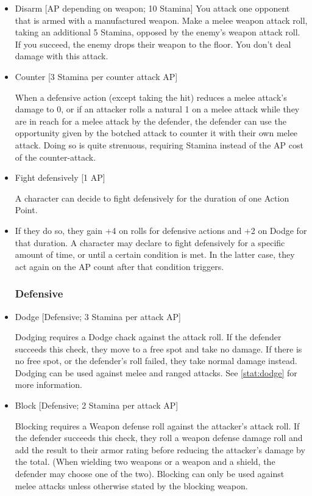 \begin{itemize}
\item Disarm [AP depending on weapon; 10 Stamina]
You attack one opponent that is armed with a manufactured weapon.
Make a melee weapon attack roll, taking an additional 5 Stamina, opposed by the enemy's weapon attack roll.
If you succeed, the enemy drops their weapon to the floor.
You don't deal damage with this attack.\\


\item Counter [3 Stamina per counter attack AP]

When a defensive action (except taking the hit) reduces a melee attack's damage to 0, or if an attacker rolls a natural 1 on a melee attack while they are in reach for a melee attack by the defender, the defender can use the opportunity given by the botched attack to counter it with their own melee attack.
Doing so is quite strenuous, requiring Stamina instead of the AP cost of the counter-attack.


\item Fight defensively [1 AP]

A character can decide to fight defensively for the duration of one Action Point.

\item If they do so, they gain +4 on rolls for defensive actions and +2 on Dodge for that duration.
A character may declare to fight defensively for a specific amount of time, or until a certain condition is met.
In the latter case, they act again on the AP count after that condition triggers.

\subsubsection{Defensive}\label{subsubsec:defensiveStaticCombatActions}


\item Dodge [Defensive; 3 Stamina per attack AP]

Dodging requires a Dodge chack against the attack roll.
If the defender succeeds this check, they move  to a free spot and take no damage.
If there is no free spot, or the defender's roll failed, they take normal damage instead.
Dodging can be used against melee and ranged attacks.
See \ref{stat:dodge} for more information.

\item Block [Defensive; 2 Stamina per attack AP]

Blocking requires a Weapon defense roll against the attacker's attack roll.
If the defender succeeds this check, they roll a weapon defense damage roll and add the result to their armor rating before reducing the attacker's damage by the total.
(When wielding two weapons or a weapon and a shield, the defender may choose one of the two).
Blocking can only be used against melee attacks unless otherwise stated by the blocking weapon.


\end{itemize}
